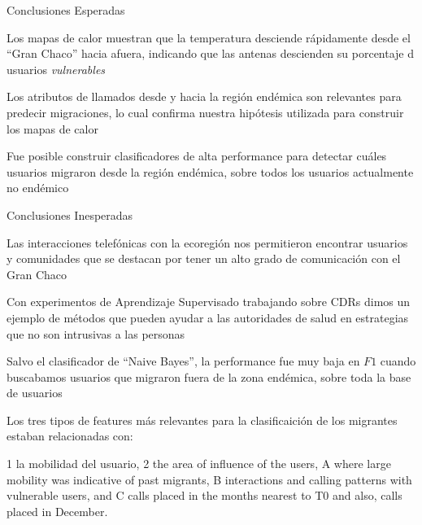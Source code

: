 \documentclass{beamer}
\begin{document}
\begin{frame}{Conclusiones Esperadas}

Los mapas de calor muestran que la temperatura desciende rápidamente desde el ``Gran Chaco'' hacia afuera, indicando que las antenas descienden su porcentaje d usuarios \textit{vulnerables}

\medskip
Los atributos de llamados desde y hacia la región endémica son relevantes para predecir migraciones, lo cual confirma nuestra hipótesis utilizada para construir los mapas de calor

\medskip
Fue posible construir clasificadores de alta performance para detectar cuáles usuarios migraron desde la región endémica, sobre todos los usuarios actualmente no endémico



\end{frame}



\begin{frame}{Conclusiones Inesperadas}

Las interacciones telefónicas con la ecoregión nos permitieron encontrar usuarios y comunidades que se destacan por tener un alto grado de comunicación con el Gran Chaco

\medskip
Con experimentos de Aprendizaje Supervisado trabajando sobre CDRs dimos un ejemplo de métodos que pueden ayudar a las autoridades de salud en estrategias que no son intrusivas a las personas

\medskip
Salvo el clasificador de ``Naive Bayes'', la performance fue muy baja en $F1$ cuando buscabamos usuarios que migraron fuera de la zona endémica, sobre toda la base de usuarios


\medskip
Los tres tipos de features más relevantes para la clasificaición de los migrantes estaban relacionadas con:

1 la mobilidad del usuario,
2 the area of influence of the
users, A where large mobility was indicative of past migrants, B interactions and calling
patterns with vulnerable users, and C calls placed in the months nearest to T0 and
also, calls placed in December.

\end{frame}
\end{document}
